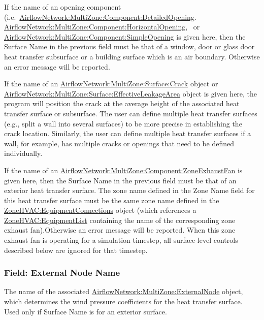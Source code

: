 If the name of an opening component (i.e.~\hyperref[airflownetworkmultizonecomponentdetailedopening]{AirflowNetwork:MultiZone:Component:DetailedOpening}. \hyperref[airflownetworkmultizonecomponenthorizontalopening]{AirflowNetwork:MultiZone:Component:HorizontalOpening},~ or \hyperref[airflownetworkmultizonecomponentsimpleopening]{AirflowNetwork:MultiZone:Component:SimpleOpening} is given here, then the Surface Name in the previous field must be that of a window, door or glass door heat transfer subsurface or a building surface which is an air boundary. Otherwise an error message will be reported.

If the name of an \hyperref[airflownetworkmultizonesurfacecrack]{AirflowNetwork:MultiZone:Surface:Crack} object or \hyperref[airflownetworkmultizonesurfaceeffectiveleakagearea]{AirflowNetwork:MultiZone:Surface:EffectiveLeakageArea} object is given here, the program will position the crack at the average height of the associated heat transfer surface or subsurface. The user can define multiple heat transfer surfaces (e.g., split a wall into several surfaces) to be more precise in establishing the crack location. Similarly, the user can define multiple heat transfer surfaces if a wall, for example, has multiple cracks or openings that need to be defined individually.

If the name of an \hyperref[airflownetworkmultizonecomponentzoneexhaustfan]{AirflowNetwork:MultiZone:Component:ZoneExhaustFan} is given here, then the Surface Name in the previous field must be that of an exterior heat transfer surface. The zone name defined in the Zone Name field for this heat transfer surface must be the same zone name defined in the \hyperref[zonehvacequipmentconnections]{ZoneHVAC:EquipmentConnections} object (which references a \hyperref[zonehvacequipmentlist]{ZoneHVAC:EquipmentList} containing the name of the corresponding zone exhaust fan).Otherwise an error message will be reported. When this zone exhaust fan is operating for a simulation timestep, all surface-level controls described below are ignored for that timestep.

\subsubsection{Field: External Node Name}\label{field-external-node-name}

The name of the associated \hyperref[airflownetworkmultizoneexternalnode]{AirflowNetwork:MultiZone:ExternalNode} object, which
determines the wind pressure coefficients for the heat transfer surface. Used
only if Surface Name is for an exterior surface.

